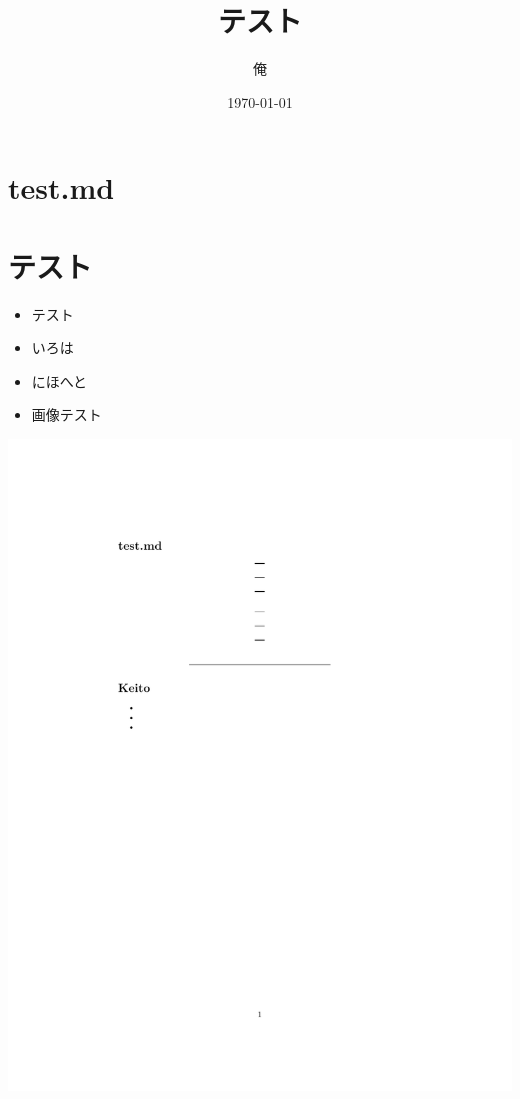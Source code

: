 \documentclass{ltjsarticle}
\date{\today}
\author{俺}
\title{テスト}
\begin{document}
\maketitle
\section{test.md}

\section{テスト}

\begin{itemize}
\item
  テスト
\item
  いろは
\item
  にほへと
\item
  画像テスト
\end{itemize}

\includegraphics{example.pdf}
\end{document}
